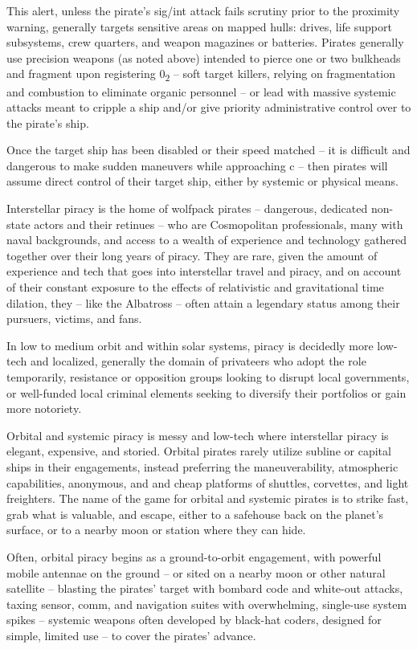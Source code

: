 This alert, unless the pirate's sig/int attack fails scrutiny prior to the proximity warning, generally
targets sensitive areas on mapped hulls: drives, life support subsystems, crew quarters, and
weapon magazines or batteries. Pirates generally use precision weapons (as noted above)
intended to pierce one or two bulkheads and fragment upon registering 0\textsubscript{2}  -- soft target killers,
relying on fragmentation and combustion to eliminate organic personnel -- or lead with massive
systemic attacks meant to cripple a ship and/or give priority administrative control over to the
pirate's ship.

Once the target ship has been disabled or their speed matched -- it is difficult and dangerous to
make sudden maneuvers while approaching c -- then pirates will assume direct control of their
target ship, either by systemic or physical means.

Interstellar piracy is the home of wolfpack pirates -- dangerous, dedicated non-state actors and
their retinues -- who are Cosmopolitan professionals, many with naval backgrounds, and access
to a wealth of experience and technology gathered together over their long years of piracy. They
are rare, given the amount of experience and tech that goes into interstellar travel and piracy, and
on account of their constant exposure to the effects of relativistic and gravitational time dilation,
they  -- like the Albatross -- often attain a legendary status among their pursuers, victims, and
fans.

In low to medium orbit and within solar systems, piracy is decidedly more low-tech and localized,
generally the domain of privateers who adopt the role temporarily, resistance or opposition groups
looking to disrupt local governments, or well-funded local criminal elements seeking to diversify
their portfolios or gain more notoriety.

Orbital and systemic piracy is messy and low-tech where interstellar piracy is elegant, expensive,
and storied. Orbital pirates rarely utilize subline or capital ships in their engagements, instead
preferring the maneuverability, atmospheric capabilities, anonymous, and and cheap platforms of
shuttles, corvettes, and light freighters. The name of the game for orbital and systemic pirates is
to strike fast, grab what is valuable, and escape, either to a safehouse back on the planet's
surface, or to a nearby moon or station where they can hide.

Often, orbital piracy begins as a ground-to-orbit engagement, with powerful mobile antennae on
the ground -- or sited on a nearby moon or other natural satellite -- blasting the pirates' target with
bombard code and white-out attacks, taxing sensor, comm, and navigation suites with
overwhelming, single-use system spikes -- systemic weapons often developed by black-hat
coders, designed for simple, limited use -- to cover the pirates' advance.

